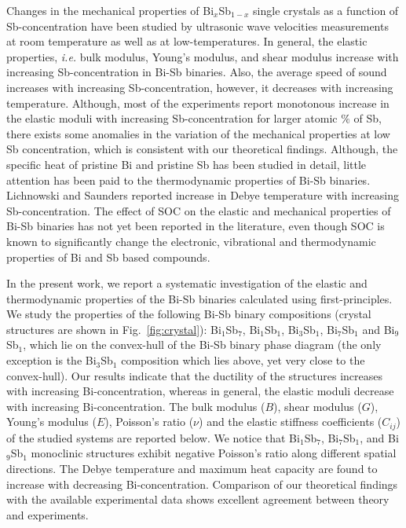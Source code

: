 \documentclass[twocolumn,superscriptaddress,nofootinbib,floatfix,aps,showpacs,prb,citeautoscript,reprint]{revtex4-1}
\begin{document}
Changes in the mechanical properties of Bi$_{x}$Sb$_{1-x}$ single crystals as a function of Sb-concentration have been studied by ultrasonic wave velocities measurements at room temperature as well as at low-temperatures.\cite{Gopinathan1974, Lichnowski1976, Cankurtaran1985, Dominec1985, Cankurtaran1986, EMUNA2013} In general, the elastic properties, {\it i.e.} bulk modulus, Young's modulus, and shear modulus increase with increasing Sb-concentration in Bi-Sb binaries. \cite{Gopinathan1974} Also, the average speed of sound increases with increasing Sb-concentration, however, it decreases with increasing temperature. \cite{EMUNA2013} Although, most of the experiments report monotonous increase in the elastic moduli with increasing Sb-concentration for larger atomic $\%$ of Sb, there exists some anomalies in the variation of the mechanical properties at low Sb concentration, which is consistent with our theoretical findings. \cite{Gopinathan1974} Although, the specific heat of pristine Bi\cite{KeesomBi1054, CetasPRB1969, Archer1995, BiSOC_PRL2007} and pristine Sb\cite{DeSorbo1953, SbSOC_PRB2008} has been studied in detail,\cite{SbSOC_PRB2008, BiSOC_PRL2007} little attention has been paid to the thermodynamic properties of Bi-Sb binaries\cite{Bunton1969, Lichnowski1976, LeePRB2014}. Lichnowski and Saunders reported increase in Debye temperature with increasing Sb-concentration.\cite{Lichnowski1976} The effect of SOC on the elastic and mechanical properties of Bi-Sb binaries has not yet been reported in the literature, even though SOC is known to significantly change the electronic, vibrational and thermodynamic properties of Bi and Sb based compounds. \cite{BiSOC_PRB2007, SbSOC_PRB2008, BiSOC_PRL2007} 

In the present work, we report a systematic investigation of the elastic and thermodynamic properties of the Bi-Sb binaries calculated using first-principles. We study the properties of the following Bi-Sb binary compositions (crystal structures are shown in Fig.~\ref{fig:crystal}): Bi$_{1}$Sb$_{7}$, Bi$_{1}$Sb$_{1}$, Bi$_{3}$Sb$_{1}$, Bi$_{7}$Sb$_{1}$ and Bi$_{9}$Sb$_{1}$, which lie on the convex-hull of the Bi-Sb binary phase diagram (the only exception is the Bi$_{3}$Sb$_{1}$ composition which lies above, yet very close to the convex-hull)\cite{singh2016PCCP}. Our results indicate that the ductility of the structures increases with increasing Bi-concentration, whereas in general, the elastic moduli decrease with increasing Bi-concentration. The bulk modulus ($B$), shear modulus ($G$), Young's modulus ($E$), Poisson's ratio ($\nu$) and the elastic stiffness coefficients ($C_{ij}$) of the studied systems are reported below. We notice that Bi$_{1}$Sb$_{7}$, Bi$_{7}$Sb$_{1}$, and Bi$_{9}$Sb$_{1}$ monoclinic structures exhibit negative Poisson's ratio along different spatial directions. The Debye temperature and maximum heat capacity are found to increase with decreasing Bi-concentration. Comparison of our theoretical findings with the available experimental data shows excellent agreement between theory and experiments.  
\end{document}
